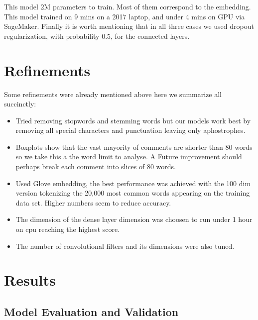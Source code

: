 \documentclass{report}
\begin{document}
This model 2M parameters to train. Most of them correspond to the embedding. This model trained on 9 mins
on a 2017 laptop, and under 4 mins on GPU via SageMaker. Finally it is worth mentioning that in all three cases 
we used dropout regularization, with probability 0.5, for the connected layers.

\section{Refinements}

Some refinements were already mentioned above here we summarize all succinctly:
\begin{itemize}
\item Tried removing stopwords and stemming words but our models work best by removing all special 
characters and punctuation leaving only aphostrophes. 
\item Boxplots show that the vast mayority of comments are shorter than 80 words so we take this a the word 
limit to analyse. A Future improvement should perhaps break each comment into slices of 80 words. 
\item Used Glove embedding, the best performance was achieved with the 100 dim version tokenizing the 
20,000 most common words appearing on the training data set. Higher numbers seem to reduce accuracy. 
\item The dimension of the dense layer dimension was choosen to run under 1 hour on cpu reaching the highest score. 
\item The number of convolutional filters and its dimensions were also tuned. 
\end{itemize}

\section{Results} 


\subsection{Model Evaluation and Validation}
\end{document}
